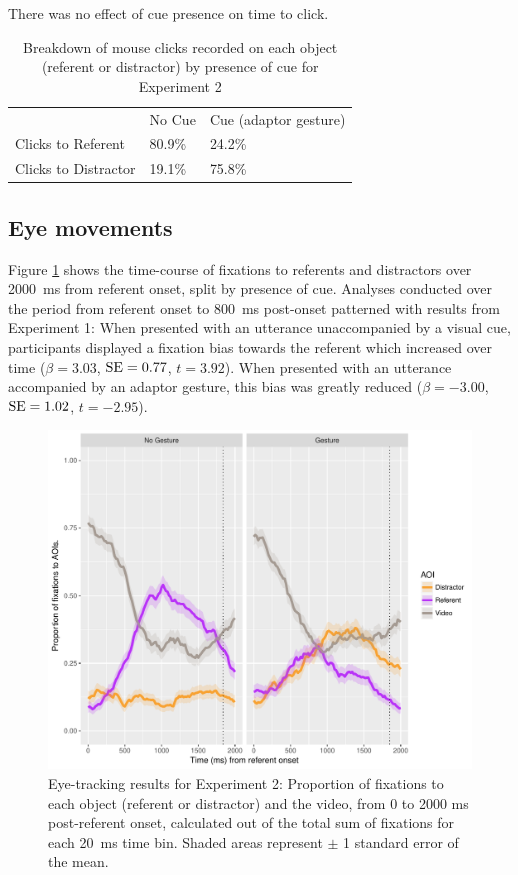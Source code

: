 \documentclass[a4paper,man,natbib]{apa6}
\newcommand{\resultsLM}[3]{$\beta = #1$, $\textnormal{SE} = #2$, $t #3$}
\begin{document}
There was no effect of cue presence on time to click.

\begin{table}
\caption{Breakdown of mouse clicks recorded on each object (referent or distractor) by presence of cue for Experiment 2}
\label{table:v2_clicks}
\begin{tabularx}{\linewidth}{YYY}
\hline
& No Cue & Cue (adaptor gesture) \\
Clicks to Referent & 80.9\% & 24.2\%  \\
Clicks to Distractor & 19.1\% & 75.8\%  \\
\hline
\end{tabularx}
\end{table}


\subsection{Eye movements}
Figure \ref{fig:v2_eye} shows the time-course of fixations to referents and distractors over 2000~ms from referent onset, split by presence of cue.
Analyses conducted over the period from referent onset to 800~ms post-onset patterned with results from Experiment 1: 
When presented with an utterance unaccompanied by a visual cue, participants displayed a fixation bias towards the referent which increased over time (\resultsLM{3.03}{0.77}{=3.92}).
When presented with an utterance accompanied by an adaptor gesture, this bias was greatly reduced (\resultsLM{-3.00}{1.02}{=-2.95}).

\begin{figure}[Ht]
  \centering
	\includegraphics[width=\linewidth]{./img/e8_fixations.pdf}
  \caption{Eye-tracking results for Experiment 2: Proportion of fixations to each object (referent or distractor) and the video, from 0 to 2000 ms post-referent onset, calculated out of the total sum of fixations for each 20~ms time bin. Shaded areas represent $\pm$ 1 standard error of the mean.}
  \label{fig:v2_eye}
\end{figure}
\end{document}
